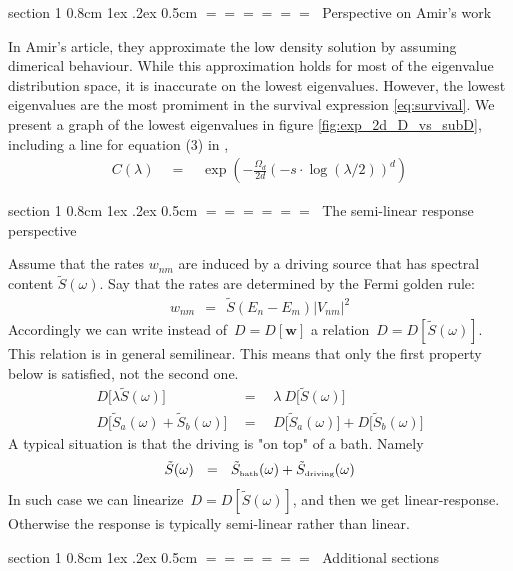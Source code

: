 \documentclass[onecolumn,fleqn,notitlepage,secnumarabic]{revtex4}
\makeatletter
\newcommand{\tbox}[1]{\mbox{\tiny #1}}
\newcommand{\beq}{\begin{eqnarray}}
\newcommand{\eeq}{\end{eqnarray}}
\def\section{%
  \@startsection
    {section}%
    {1}%
    {\z@}%
    {0.8cm \@plus1ex \@minus .2ex}%
    {0.5cm}%
    {\Large\bf $=\!=\!=\!=\!=\!=\;$}%
}%
\makeatother
\begin{document}
\section{Perspective on Amir's work}

In Amir's article, they approximate the low density solution by assuming dimerical behaviour. While this approximation holds for most of the eigenvalue distribution space, it is inaccurate on the lowest eigenvalues. However, the lowest eigenvalues are the most promiment in the survival expression \eqref{eq:survival}. We present a graph of the lowest eigenvalues in figure \ref{fig:exp_2d_D_vs_subD}, including a line for equation (3) in \cite{amir}, 
\beq\label{eq:amir_expected}
  C(\lambda) \quad = \quad \exp\left( -\frac{\Omega_d}{2d} \left(-s\cdot \log(\lambda/2)\right)^d \right)
\eeq


\section{The semi-linear response perspective}

Assume that the rates $w_{nm}$ are induced 
by a driving source that has spectral content $\tilde{S}(\omega)$. 
Say that the rates are determined by the Fermi golden rule:
%
\beq
w_{nm} \ \ = \ \ \tilde{S}(E_n-E_m) |V_{nm}|^2
\eeq
%
Accordingly we can write instead of~$D=D[\bm{w}]$ a relation~$D=D[\tilde{S}(\omega)]$.
This relation is in general semilinear. This means that only the first property below 
is satisfied, not the second one.
%
\beq
D\big[ \lambda \tilde{S}(\omega)\big]  \ \ &=& \ \  \lambda \ D\big[\tilde{S}(\omega)\big] 
\\
D\big[\tilde{S}_a(\omega) + \tilde{S}_b(\omega)\big]  \ \ &=& \ \  D\big[\tilde{S}_a(\omega)\big] + D\big[\tilde{S}_b(\omega)\big]
\eeq
%
A typical situation is that the driving is "on top" of a bath. Namely 
%
\beq
\tilde{S}(\omega) \ \ = \ \ \tilde{S}_{\tbox{bath}}(\omega) + \tilde{S}_{\tbox{driving}}(\omega)
\eeq  
%
In such case we can linearize~$D=D[\tilde{S}(\omega)]$, and then we get 
linear-response. Otherwise the response is typically semi-linear rather than linear. 



\section{Additional sections}
\end{document}
